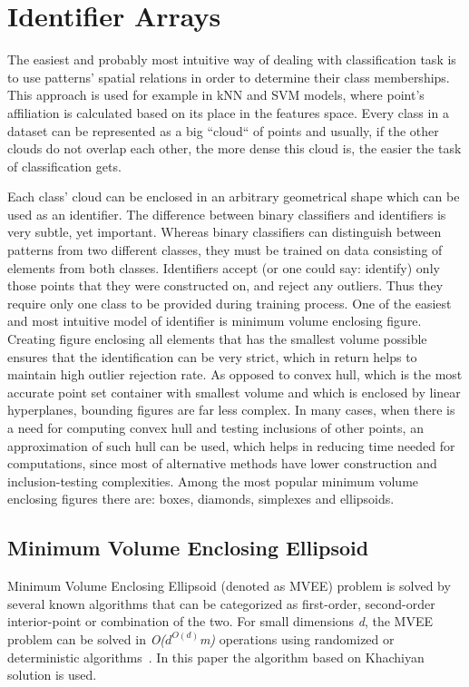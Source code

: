\chapter{Identifier Arrays}

The easiest and probably most intuitive way of dealing with classification task is to use patterns' spatial relations in order to determine their class memberships. This approach is used for example in kNN and SVM models, where point's affiliation is calculated based on its place in the features space. Every class in a dataset can be represented as a big ``cloud`` of points and usually, if the other clouds do not overlap each other, the more dense this cloud is, the easier the task of classification gets.

Each class' cloud can be enclosed in an arbitrary geometrical shape which can be used as an identifier. The difference between binary classifiers and identifiers is very subtle, yet important. Whereas binary classifiers can distinguish between patterns from two different classes, they must be trained on data consisting of elements from both classes. Identifiers accept (or one could say: identify) only those points that they were constructed on, and reject any outliers. Thus they require only one class to be provided during training process. One of the easiest and most intuitive model of identifier is minimum volume enclosing figure. Creating figure enclosing all elements that has the smallest volume possible ensures that the identification can be very strict, which in return helps to maintain high outlier rejection rate. As opposed to convex hull, which is the most accurate point set container with smallest volume and which is enclosed by linear hyperplanes, bounding figures are far less complex. In many cases, when there is a need for computing convex hull and testing inclusions of other points, an approximation of such hull can be used, which helps in reducing time needed for computations, since most of alternative methods have lower construction and inclusion-testing complexities. Among the most popular minimum volume enclosing figures there are: boxes, diamonds, simplexes and ellipsoids.

\section{Minimum Volume Enclosing Ellipsoid}

Minimum Volume Enclosing Ellipsoid (denoted as MVEE) problem is solved by several known algorithms that can be categorized as first-order, second-order interior-point or combination of the two. For small dimensions \textit{d}, the MVEE problem can be solved in \textit{O($d^{O(d)}$m)} operations using randomized or deterministic algorithms~\cite{MVEEMichaelTodd2005}. In this paper the algorithm based on Khachiyan solution is used.

